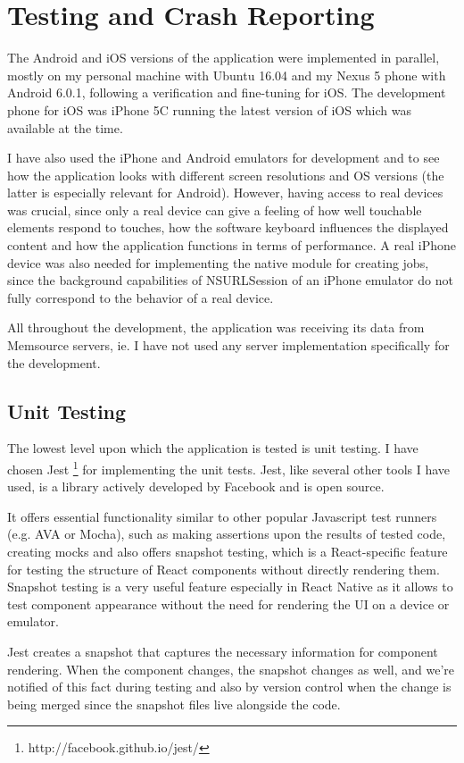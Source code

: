\chapter{Testing and Crash Reporting}

The Android and iOS versions of the application were implemented in parallel, mostly on my personal machine with Ubuntu 16.04 and my Nexus 5 phone with Android 6.0.1, following a verification and fine-tuning for iOS. The development phone for iOS was iPhone 5C running the latest version of iOS which was available at the time. 

I have also used the iPhone and Android emulators for development and to see how the application looks with different screen resolutions and OS versions (the latter is especially relevant for Android). However, having access to real devices was crucial, since only a real device can give a feeling of how well touchable elements respond to touches, how the software keyboard influences the displayed content and how the application functions in terms of performance. A real iPhone device was also needed for implementing the native module for creating jobs, since the background capabilities of NSURLSession of an iPhone emulator do not fully correspond to the behavior of a real device.

All throughout the development, the application was receiving its data from Memsource servers, ie. I have not used any server implementation specifically for the development.


\section{Unit Testing}
The lowest level upon which the application is tested is unit testing. I have chosen Jest \footnote{http://facebook.github.io/jest/} for implementing the unit tests. Jest, like several other tools I have used, is a library actively developed by Facebook and is open source. 

It offers essential functionality similar to other popular Javascript test runners (e.g. AVA or Mocha), such as making assertions upon the results of tested code, creating mocks and also offers snapshot testing, which is a React-specific feature for testing the structure of React components without directly rendering them. Snapshot testing is a very useful feature especially in React Native as it allows to test component appearance without the need for rendering the UI on a device or emulator. 

Jest creates a snapshot that captures the necessary information for component rendering. When the component changes, the snapshot changes as well, and we're notified of this fact during testing and also by version control when the change is being merged since the snapshot files live alongside the code. 

